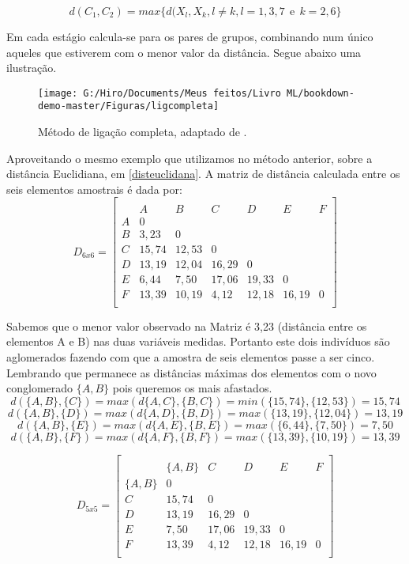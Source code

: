 \documentclass[
]{book}
\begin{document}
\begin{equation}
d(C_1,C_2)=max \{d(X_l,X_k, l\neq k,l=1,3,7 \ \ \mbox{e} \ \ k=2,6\}
 \label{eq:ligcompleta}
\end{equation}

Em cada estágio calcula-se para os pares de grupos, combinando num único aqueles que estiverem com o menor valor da distância. Segue abaixo uma ilustração.

\begin{figure}

{\centering \texttt{[image: G:/Hiro/Documents/Meus feitos/Livro ML/bookdown-demo-master/Figuras/ligcompleta]} 

}

\caption{Método de ligação completa, adaptado de \citet{mingoti2007analise}.}\label{fig:ligcompleta}
\end{figure}



Aproveitando o mesmo exemplo que utilizamos no método anterior, sobre a distância Euclidiana, em \ref{disteuclidana}. A matriz de distância calculada entre os seis elementos amostrais é dada por:
\[D_{6x6}=\begin{bmatrix}\\
 &A&B&C&D&E&F \\
 A&0&&&&&\\
 B&3,23&0&&&&\\
 C & 15,74& 12,53&0&&&\\
 D& 13,19& 12,04& 16,29&0&&\\
 E& 6,44& 7,50& 17,06& 19,33&0&\\
 F& 13,39& 10,19& 4,12& 12,18& 16,19&0 \\
\end{bmatrix}\]

Sabemos que o menor valor observado na Matriz é 3,23 (distância entre os elementos A e B) nas duas variáveis medidas. Portanto este dois indivíduos são aglomerados fazendo com que a amostra de seis elementos passe a ser cinco. Lembrando que permanece as distâncias máximas dos elementos com o novo conglomerado \(\{A,B\}\) pois queremos os mais afastados.
\[d(\{A,B\},\{C\})=max(d\{A,C\},\{B,C\})=min(\{15,74\},\{12,53\})=15,74\]
\[d(\{A,B\},\{D\})=max(d\{A,D\},\{B,D\})=max(\{13,19\},\{12,04\})=13,19\]
\[d(\{A,B\},\{E\})=max(d\{A,E\},\{B,E\})=max(\{6,44\},\{7,50\})=7,50\]
\[d(\{A,B\},\{F\})=max(d\{A,F\},\{B,F\})=max(\{13,39\},\{10,19\})=13,39\]

\[D_{5x5}=\begin{bmatrix}\\
 &\{A,B\}&C&D&E&F \\
 \{A,B\}&0&&&&\\
 C & 15,74&0&&&\\
 D& 13,19& 16,29&0&&\\
 E& 7,50& 17,06& 19,33&0&\\
 F& 13,39& 4,12& 12,18& 16,19&0 \\
\end{bmatrix}\]
\end{document}

